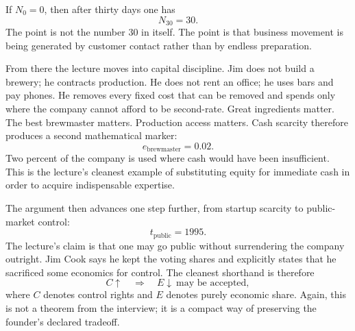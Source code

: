 If \(N_0=0\), then after thirty days one has
\begin{equation}
N_{30}=30.
\end{equation}
The point is not the number \(30\) in itself. The point is that business movement is being generated by customer contact rather than by endless preparation.

\begin{figure}
\centering
{}
\end{figure}

From there the lecture moves into capital discipline. Jim does not build a brewery; he contracts production. He does not rent an office; he uses bars and pay phones. He removes every fixed cost that can be removed and spends only where the company cannot afford to be second-rate. Great ingredients matter. The best brewmaster matters. Production access matters. Cash scarcity therefore produces a second mathematical marker:
\begin{equation}
e_{\text{brewmaster}} = 0.02.
\end{equation}
Two percent of the company is used where cash would have been insufficient. This is the lecture's cleanest example of substituting equity for immediate cash in order to acquire indispensable expertise.

The argument then advances one step further, from startup scarcity to public-market control:
\begin{equation}
t_{\text{public}} = 1995.
\end{equation}
The lecture's claim is that one may go public without surrendering the company outright. Jim Cook says he kept the voting shares and explicitly states that he sacrificed some economics for control. The cleanest shorthand is therefore
\begin{equation}
C \uparrow \quad \Longrightarrow \quad E \downarrow \ \text{may be accepted},
\end{equation}
where \(C\) denotes control rights and \(E\) denotes purely economic share. Again, this is not a theorem from the interview; it is a compact way of preserving the founder's declared tradeoff.

